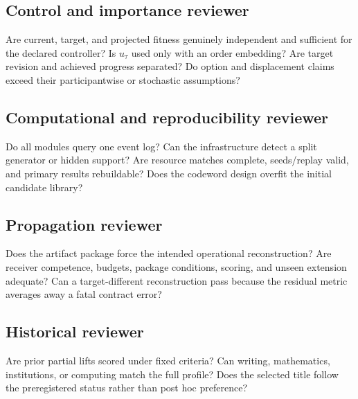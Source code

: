\documentclass[11pt]{article}
\begin{document}
\subsection{Control and importance reviewer}

Are current, target, and projected fitness genuinely independent and sufficient for the declared controller? Is $u_\tau$ used only with an order embedding? Are target revision and achieved progress separated? Do option and displacement claims exceed their participantwise or stochastic assumptions?

\subsection{Computational and reproducibility reviewer}

Do all modules query one event log? Can the infrastructure detect a split generator or hidden support? Are resource matches complete, seeds/replay valid, and primary results rebuildable? Does the codeword design overfit the initial candidate library?

\subsection{Propagation reviewer}

Does the artifact package force the intended operational reconstruction? Are receiver competence, budgets, package conditions, scoring, and unseen extension adequate? Can a target-different reconstruction pass because the residual metric averages away a fatal contract error?

\subsection{Historical reviewer}

Are prior partial lifts scored under fixed criteria? Can writing, mathematics, institutions, or computing match the full profile? Does the selected title follow the preregistered status rather than post hoc preference?
\end{document}
